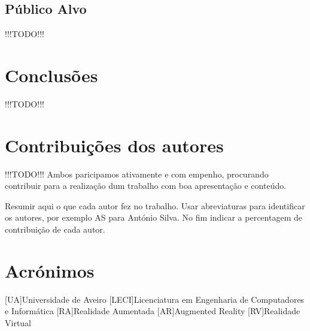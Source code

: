 \documentclass{report}
\begin{document}
\section{Público Alvo}
!!!TODO!!!

\chapter{Conclusões}
\label{chap.conclusao}
!!!TODO!!!

\chapter*{Contribuições dos autores}
!!!TODO!!! Ambos paricipamos ativamente e com empenho, procurando contribuir para a realização dum trabalho com boa apresentação e conteúdo.

Resumir aqui o que cada autor fez no trabalho. Usar abreviaturas para identificar os autores, por exemplo AS para António Silva. No fim indicar a percentagem de contribuição de cada autor.

\chapter*{Acrónimos}
\begin{acronym}
[UA]{Universidade de Aveiro}
[LECI]{Licenciatura em Engenharia de Computadores e Informática}
[RA]{Realidade Aumentada}
[AR]{Augmented Reality}
[RV]{Realidade Virtual}
\end{acronym}

\printbibliography
\end{document}

